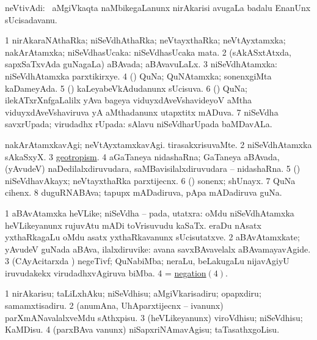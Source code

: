 \bentry
{}
\gl{\nA}
\bmng
neVtivAdi: \sA\ aMgiVkaqta naMbikegaLanunx nirAkarisi avugaLa badalu EnanUnx sUcisadavanu. 
\emng
\eentry

\bentry
{}
\gl{\gu}
\bmng
\bnum
\num{1} nirAkaraNAthaRka; niSeVdhAthaRka; neVtayxthaRka; neVtAyxtamxka; nakArAtamxka; niSeVdhasUcaka:  niSeVdhasUcaka mata. 
\num{2} (sAkASxtAtxda, sapxSaTxvAda guNagaLa) aBAvada; aBAvavuLaLx. 
\num{3} niSeVdhAtamxka:  niSeVdhAtamxka parxtikirxye. 
\num{4} (\biVga) QuNa; QuNAtamxka; sonenxgiMta kaDameyAda. 
\num{5} (\biVga) kaLeyabeVkAdudanunx sUcisuva. 
\num{6} (\viduyx) QuNa; ilekATxrXnfgaLalilx yAva bageya viduyxdAveVshavideyoV aMtha viduyxdAveVshaviruva yA aMthadanunx utapxtitx mADuva. 
\num{7} niSeVdha savxrUpada; virudadhx rUpada:  sAlavu niSeVdharUpada baMDavALa. 
\enum
\emng

\noindent
\gl{\pagu}
\bmng
\bnum
{}  
\banum
{} nakArAtamxkavAgi; neVtAyxtamxkavAgi. 
 tirasakxrisuvaMte. 
\eanum
\numie
\num{2}  niSeVdhAtamxka sAkaSxyX. 
\num{3}  \hyperref{kandict_g.pdf}{G}{geotropism pagu}{geotropism}. 
\num{4}  aGaTaneya nidashaRna; GaTaneya aBAvada, (yAvudeV) naDedilalxdiruvudara, saMBavisilalxdiruvudara -- nidashaRna. 
\num{5}  (\takaR) niSeVdhavAkayx; neVtayxthaRka parxtijecnx. 
\num{6}  (\hA) sonenx; shUnayx. 
\num{7}  QuNa cihenx. 
\num{8}  duguRNABAva; tapupx mADadiruva, pApa mADadiruva guNa. 
\enum
\emng
\eentry

\bentry
{}
\gl{\nA}
\bmng
\bnum
\num{1} aBAvAtamxka heVLike; niSeVdha -- pada, utatxra:  oMdu niSeVdhAtamxka heVLikeyanunx rujuvAtu mADi toVrisuvudu kaSaTx.  eraDu nAsatx yxthaRkagaLu oMdu asatx yxthaRkavanunx sUcisutatxve. 
\num{2} aBAvAtamxkate; yAvudeV guNada aBAva, ilalxdiruvike:  avana savxBAvavelalx aBAvamayavAgide. 
\num{3} (CAyAcitarxda \vi) negeTivf; QuNabiMba; neraLu, beLakugaLu nijavAgiyU iruvudakekx virudadhxvAgiruva biMba. 
\num{4} = \hyperlink{negation(4)}{negation\((4)\)}. 
\enum
\emng
\eentry

\bentry
{}
\gl{\sakirx}
\bmng
\bnum
\num{1} nirAkarisu; taLiLxhAku; niSeVdhisu; aMgiVkarisadiru; opapxdiru; samamxtisadiru. 
\num{2} (anumAna, UhAparxtijecnx -- ivanunx) parXmANavalalxveMdu sAthxpisu. 
\num{3} (heVLikeyanunx) viroVdhisu; niSeVdhisu; KaMDisu. 
\num{4} (parxBAva \mo vanunx) niSapxriNAmavAgisu; taTasathxgoLisu. 
\enum
\emng
\eentry

